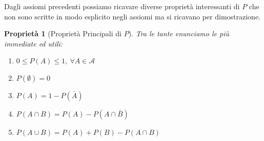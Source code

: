 \documentclass[
  11pt,
]{book}
\theoremstyle{mytheoremstyle}
\newtheorem{proposition}{Proprietà}[section]
\theoremstyle{mydefstyle}
\begin{document}
Dagli assiomi precedenti possiamo ricavare diverse proprietà
interessanti di \(P\) che non sono scritte in modo esplicito negli assiomi
ma si ricavano per dimostrazione.

\begin{info}

\begin{proposition}[Proprietà Principali di $P$]

Tra le tante enunciamo le più immediate ed utili:

\begin{enumerate}
\def\labelenumi{\arabic{enumi}.}
\item
  \(0\le P(A) \le 1,~\forall A\in\mathscr{A}\)
\item
  \(P(\emptyset)=0\)
\item
  \(P(A)=1-P(\bar A)\)
\item
  \(P(A\cap B)=P(A)-P(A\cap \bar B)\)
\item
  \(P(A\cup B)=P(A)+P(B)-P(A\cap B)\)
\end{enumerate}

\end{proposition}

\end{info}
\end{document}
